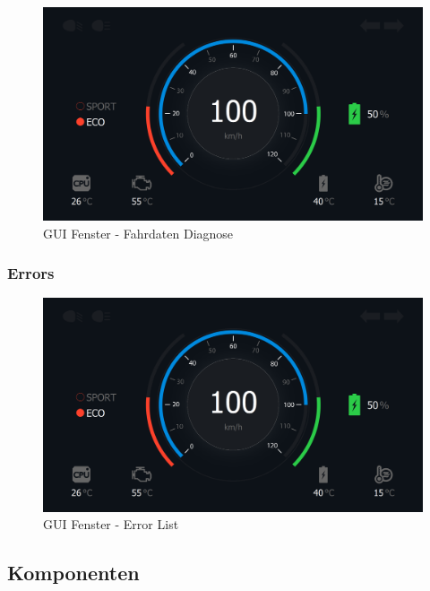 \begin{figure}[H]
	\begin{center}
		\includegraphics[scale=0.24]{figures/hcis/window_dashboard.png}
		\caption{GUI Fenster - Fahrdaten Diagnose}
	\end{center}
\end{figure}

\subsubsection{Errors}

\begin{figure}[H]
	\begin{center}
		\includegraphics[scale=0.24]{figures/hcis/window_dashboard.png}
		\caption{GUI Fenster - Error List}
	\end{center}
\end{figure}

\subsection{Komponenten}

